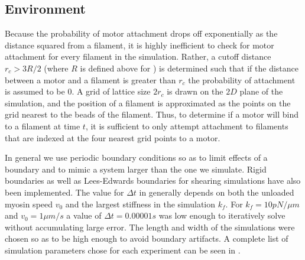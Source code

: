 \documentclass[12pt]{article}
\begin{document}
\subsection{Environment}
\par
Because the probability of motor attachment drops off exponentially as the distance squared from a filament, it is
highly inefficient to check for motor attachment for every filament in the simulation. Rather, a cutoff distance
$r_c>3R/2$ (where $R$ is defined above for )
is determined such that if the distance between a motor and a filament is greater than $r_c$ the probability of
attachment is assumed to be $0$. A grid of lattice size $2r_c$ is drawn on the
$2D$ plane of the simulation, and the position of a filament is approximated as the points on the grid nearest to the
beads of the filament. Thus, to determine if a motor will bind to a filament at time $t$, it is sufficient to
only attempt attachment to filaments that are indexed at the four nearest grid points to a motor. 
\par
In general we use periodic boundary conditions so as to limit effects of a boundary and to mimic a system larger than
the one we simulate. Rigid boundaries as well as Lees-Edwards boundaries for shearing simulations have also been
implemented. The value for $\Delta t$ in  generally depends on both the unloaded myosin speed
$v_0$ and the largest stiffness in the simulation $k_f$. For $k_f = 10pN/\mu m$ and $v_0=1\mu m/s$ a value of $\Delta t =
0.00001 s$ was low enough to iteratively solve  without accumulating large error. 
The length and width of the simulations were chosen so as to be high enough to avoid boundary artifacts. 
A complete list of simulation parameters chose for each experiment can be seen in . 
\end{document}
